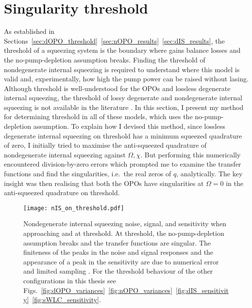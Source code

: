 \section{Singularity threshold}
\label{sec:singularity_threshold}

As established in Sections~\ref{sec:dOPO_threshold}~\ref{sec:nOPO_results}~\ref{sec:dIS_results}, the threshold of a squeezing system is the boundary where gains balance losses and the no-pump-depletion assumption breaks. Finding the threshold of nondegenerate internal squeezing is required to understand where this model is valid and, experimentally, how high the pump power can be raised without lasing. Although threshold is well-understood for the OPOs and lossless degenerate internal squeezing, the threshold of lossy degenerate and nondegenerate internal squeezing is not available in the literature . In this section, I present my method for determining threshold in all of these models, which uses the no-pump-depletion assumption.
To explain how I devised this method, since lossless degenerate internal squeezing on threshold has a minimum squeezed quadrature of zero, I initially tried to maximise the anti-squeezed quadrature of nondegenerate internal squeezing against $\Omega,\chi$. But performing this numerically encountered division-by-zero errors which prompted me to examine the transfer functions and find the singularities, i.e.\ the real zeros of $q$, analytically. The key insight was then realising that both the OPOs have singularities at $\Omega=0$ in the anti-squeezed quadrature on threshold.

\begin{figure}
    \centering
    \texttt{[image: nIS\_on\_threshold.pdf]}
    \caption{ Nondegenerate internal squeezing noise, signal, and sensitivity when approaching and at threshold. At threshold, the no-pump-depletion assumption breaks and the transfer functions are singular. The finiteness of the peaks in the noise and signal responses and the appearance of a peak in the sensitivity are due to numerical error and limited sampling . For the threshold behaviour of the other configurations in this thesis see Figs.~\ref{fig:dOPO_variances}~\ref{fig:nOPO_variances}~\ref{fig:dIS_sensitivity}~\ref{fig:sWLC_sensitivity}.}
    \label{fig:nIS_on_threshold}
\end{figure}

